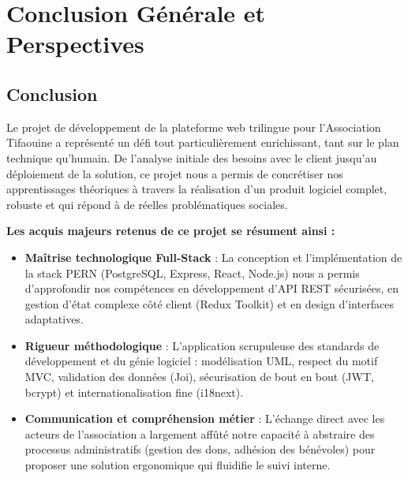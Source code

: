 \documentclass[12pt,a4paper,twoside,openright]{report}
\begin{document}
\chapter*{Conclusion Générale et Perspectives}

\vspace{0.3cm}
\noindent
{}

\section*{Conclusion}

Le projet de développement de la plateforme web trilingue pour l'Association Tifaouine a représenté un défi tout particulièrement enrichissant, tant sur le plan technique qu'humain. De l'analyse initiale des besoins avec le client jusqu'au déploiement de la solution, ce projet nous a permis de concrétiser nos apprentissages théoriques à travers la réalisation d'un produit logiciel complet, robuste et qui répond à de réelles problématiques sociales.

\textbf{Les acquis majeurs retenus de ce projet se résument ainsi :}
\begin{itemize}[label=\textcolor{primaryBlue}{\textbf{$\triangleright$}}, leftmargin=1.5cm, itemsep=0.35cm]
    \item \textbf{Maîtrise technologique Full-Stack} : La conception et l'implémentation de la stack PERN (PostgreSQL, Express, React, Node.js) nous a permis d'approfondir nos compétences en développement d'API REST sécurisées, en gestion d'état complexe côté client (Redux Toolkit) et en design d'interfaces adaptatives.
    \item \textbf{Rigueur méthodologique} : L'application scrupuleuse des standards de développement et du génie logiciel : modélisation UML, respect du motif MVC, validation des données (Joi), sécurisation de bout en bout (JWT, bcrypt) et internationalisation fine (i18next).
    \item \textbf{Communication et compréhension métier} : L'échange direct avec les acteurs de l'association a largement affûté notre capacité à abstraire des processus administratifs (gestion des dons, adhésion des bénévoles) pour proposer une solution ergonomique qui fluidifie le suivi interne.
\end{itemize}
\end{document}
